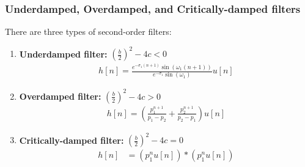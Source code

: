 \documentclass{beamer}
\begin{document}
\begin{frame}
  \frametitle{Underdamped, Overdamped, and Critically-damped filters}

  There are three types of second-order filters:
  \begin{enumerate}
  \item \textbf{Underdamped filter:} $\left(\frac{b}{2}\right)^2-4c<0$
    \begin{align*}
      h[n]=\frac{e^{-\sigma_1 (n+1)}\sin(\omega_1(n+1))}{e^{-\sigma_1}\sin(\omega_1)}u[n]
    \end{align*}
  \item \textbf{Overdamped filter:}  $\left(\frac{b}{2}\right)^2-4c>0$
    \begin{align*}
      h[n]=\left(\frac{p_1^{n+1}}{p_1-p_2}+ \frac{p_2^{n+1}}{p_2-p_1}\right)u[n]
    \end{align*}
  \item \textbf{Critically-damped filter:}  $\left(\frac{b}{2}\right)^2-4c=0$
    \begin{align*}
      h[n] &= \left(p_1^nu[n]\right)\ast \left(p_1^nu[n]\right)
    \end{align*}
  \end{enumerate}
\end{frame}
\end{document}
